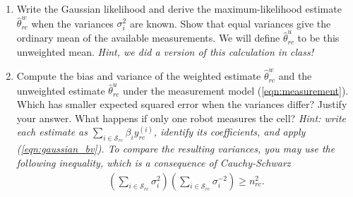 \documentclass[12pt]{article}
\begin{document}
\begin{enumerate}[label=(\alph*)]
    \item Write the Gaussian likelihood and derive the maximum-likelihood estimate $\hat\theta_{rc}^w$ when the variances $\sigma_i^2$ are known. Show that equal variances give the ordinary mean of the available measurements. We will define $\hat\theta_{rc}^u$ to be this unweighted mean. \textit{Hint, we did a version of this calculation in class!}
    \item Compute the bias and variance of the weighted estimate $\hat\theta_{rc}^w$ and the unweighted estimate $\hat\theta_{rc}^u$ under the measurement model (\ref{eqn:measurement}). Which has smaller expected squared error when the variances differ? Justify your answer. What happens if only one robot measures the cell? \textit{Hint: write each estimate as $\sum_{i\in\mathcal S_{rc}}\beta_iy_{rc}^{(i)}$, identify its coefficients, and apply (\ref{eqn:gaussian_bv}). To compare the resulting variances, you may use the following inequality, which is a consequence of Cauchy-Schwarz}
    \begin{align}\label{eqn:varcomp}
        \left(\sum_{i\in\mathcal S_{rc}}\sigma_i^2\right)\left(\sum_{i\in\mathcal S_{rc}}\sigma_i^{-2}\right)\geq n_{rc}^2.
    \end{align}
\end{enumerate}
\end{document}
